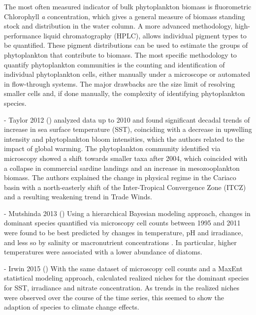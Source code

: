 \documentclass[draft]{agujournal2019}
\begin{document}
    The most often measured indicator of bulk phytoplankton biomass is fluorometric Chlorophyll \textit{a} concentration, which gives a general measure of biomass standing stock and distribution in the water column. A more advanced methodology, high-performance liquid chromatography (HPLC), allows individual pigment types to be quantified. These pigment distributions can be used to estimate the groups of phytoplankton that contribute to biomass. The most specific methodology to quantify phytoplankton communities is the counting and identification of individual phytoplankton cells, either manually under a microscope or automated in flow-through systems. The major drawbacks are the size limit of resolving smaller cells and, if done manually, the complexity of identifying phytoplankton species. 


    - Taylor 2012 ()
     analyzed data up to 2010 and found significant decadal trends of increase in sea surface temperature (SST), coinciding with a decrease in upwelling intensity and phytoplankton bloom intensities, which the authors related to the impact of global warming. The phytoplankton community identified via microscopy showed a shift towards smaller taxa after 2004, which coincided with a collapse in commercial sardine landings and an increase in mesozooplankton biomass. The authors explained the change in physical regime in the Cariaco basin with a north-easterly shift of the Inter-Tropical Convergence Zone (ITCZ) and a resulting weakening trend in Trade Winds.
    
    - Mutshinda 2013 ()
    Using a hierarchical Bayesian modeling approach, changes in dominant species quantified via microscopy cell counts between 1995 and 2011 were found to be best predicted by changes in temperature, pH and irradiance, and less so by salinity or macronutrient concentrations \cite{mutshinda_environmental_2013}. In particular, higher temperatures were associated with a lower abundance of diatoms. 
    
    - Irwin 2015 ()
    With the same dataset of microscopy cell counts and a MaxEnt statistical modeling approach,  calculated realized niches for the dominant species for SST, irradiance and nitrate concentration. As trends in the realized niches were observed over the course of the time series, this seemed to show the adaption of species to climate change effects. 
    
\end{document}
